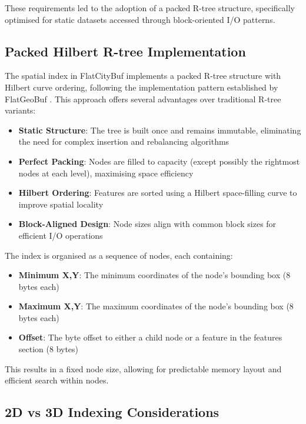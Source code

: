 These requirements led to the adoption of a packed R-tree structure, specifically optimised for static datasets accessed through block-oriented I/O patterns.

\subsection{Packed Hilbert R-tree Implementation}
\label{methodology:spatial_index:packed_rtree_implementation}

The spatial index in FlatCityBuf implements a packed R-tree structure with Hilbert curve ordering, following the implementation pattern established by FlatGeoBuf \citep{williams2022implementers}. This approach offers several advantages over traditional R-tree variants:

\begin{itemize}
    \item \textbf{Static Structure}: The tree is built once and remains immutable, eliminating the need for complex insertion and rebalancing algorithms
    \item \textbf{Perfect Packing}: Nodes are filled to capacity (except possibly the rightmost nodes at each level), maximising space efficiency
    \item \textbf{Hilbert Ordering}: Features are sorted using a Hilbert space-filling curve to improve spatial locality \citep{Kamel_Faloutsos_1993}
    \item \textbf{Block-Aligned Design}: Node sizes align with common block sizes for efficient I/O operations
\end{itemize}

The index is organised as a sequence of nodes, each containing:

\begin{itemize}
    \item \textbf{Minimum X,Y}: The minimum coordinates of the node's bounding box (8 bytes each)
    \item \textbf{Maximum X,Y}: The maximum coordinates of the node's bounding box (8 bytes each)
    \item \textbf{Offset}: The byte offset to either a child node or a feature in the features section (8 bytes)
\end{itemize}

This results in a fixed node size, allowing for predictable memory layout and efficient search within nodes.

\subsection{2D vs 3D Indexing Considerations}
\label{methodology:spatial_index:2d_vs_3d_indexing}

